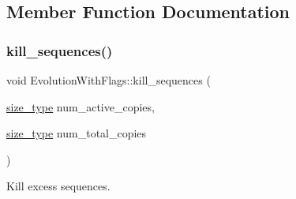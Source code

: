\subsection{Member Function Documentation}
\mbox{\label{classretrocombinator_1_1EvolutionWithFlags_ae5a9e278233d2ea42bdef4df66d4b5b9}} 
\subsubsection{\texorpdfstring{kill\+\_\+sequences()}{kill\_sequences()}}
{\footnotesize\ttfamily void Evolution\+With\+Flags\+::kill\+\_\+sequences (\begin{DoxyParamCaption}\item[{\hyperlink{namespaceretrocombinator_a8e1541b50cee66a791df4c437ccbb385}{size\+\_\+type}}]{num\+\_\+active\+\_\+copies,  }\item[{\hyperlink{namespaceretrocombinator_a8e1541b50cee66a791df4c437ccbb385}{size\+\_\+type}}]{num\+\_\+total\+\_\+copies }\end{DoxyParamCaption})\hspace{0.3cm}{\ttfamily [protected]}}



Kill excess sequences. 


